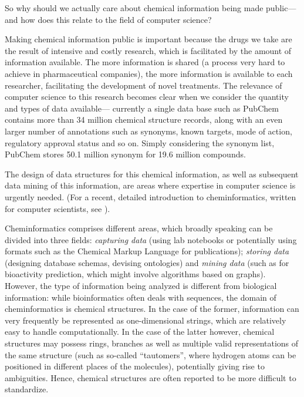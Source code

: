 \documentclass{sig-alternate}
\begin{document}
So why should we actually care about chemical information being made
public---and how does this relate to the field of computer science?

Making chemical information public is important because the drugs we
take are the result of intensive and costly research, which is
facilitated by the amount of information available. The more
information is shared (a process very hard to achieve in
pharmaceutical companies), the more information is available to each
researcher, facilitating the development of novel treatments. The
relevance of computer science to this research becomes clear when we
consider the quantity and types of data available--- currently a
single data base such as PubChem contains more than 34 million
chemical structure records, along with an even larger number of
annotations such as synonyms, known targets, mode of action,
regulatory approval status and so on.  Simply considering the synonym
list, PubChem stores 50.1 million synonym for 19.6 million compounds.

The design of data structures for this chemical information, as well
as subsequent data mining of this information, are areas where
expertise in computer science is urgently needed. (For a recent,
detailed introduction to cheminformatics, written for computer
scientists, see \cite{brown2009}).

Cheminformatics comprises different areas, which broadly speaking can
be divided into three fields: \emph{capturing data} (using lab
notebooks or potentially using formats such as the Chemical Markup
Language for publications); \emph{storing data} (designing database
schemas, devising ontologies) and \emph{mining data} (such as for
bioactivity prediction, which might involve algorithms based on
graphs).  However, the type of information being analyzed is different
from biological information: while bioinformatics often deals with
sequences, the domain of cheminformatics is chemical structures. In
the case of the former, information can very frequently be represented
as one-dimensional strings, which are relatively easy to handle
computationally. In the case of the latter however, chemical
structures may possess rings, branches as well as multiple valid
representations of the same structure (such as so-called
``tautomers'', where hydrogen atoms can be positioned in different
places of the molecules), potentially giving rise to
ambiguities. Hence, chemical structures are often reported to be more
difficult to standardize.
\end{document}
